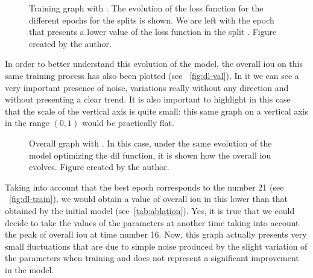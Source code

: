 \begin{figure}[p]
  \centering
  \caption[Training graph with ]{Training graph with
    . The evolution of the loss function for the different
    epochs for the  splits is shown. We are left with the epoch
    that presents a lower value of the loss function in the split
    . Figure created by the author.}%
  \label{fig:dl-train}
\end{figure}

In order to better understand this evolution of the model, the overall
\gls{iou} on this same training process has also been plotted (see \
\vref{fig:dl-val}). In it we can see a very important presence of noise,
variations really without any direction and without presenting a clear
trend. It is also important to highlight in this case that the scale of the
vertical axis is quite small: this same graph on a vertical axis in the range
\((0, 1)\) would be practically flat.

\begin{figure}[p]
  \centering
  \caption[Overall  graph with ]{Overall
    \glsentryshort{iou} graph with \glsentrylong{dil}. In this case, under the
    same evolution of the model optimizing the \gls{dil} function, it is shown
    how the overall \gls{iou} evolves. Figure created by the author.}%
  \label{fig:dl-val}
\end{figure}

Taking into account that the best epoch corresponds to the number 21 (see \
\vref{fig:dl-train}), we would obtain a value of overall \gls{iou} in this
lower than that obtained by the initial model (see\ \vref{tab:ablation}). Yes,
it is true that we could decide to take the values of the parameters at another
time taking into account the peak of overall \gls{iou} at time number 16. Now,
this graph actually presents very small fluctuations that are due to simple
noise produced by the slight variation of the parameters when training and does
not represent a significant improvement in the model.

